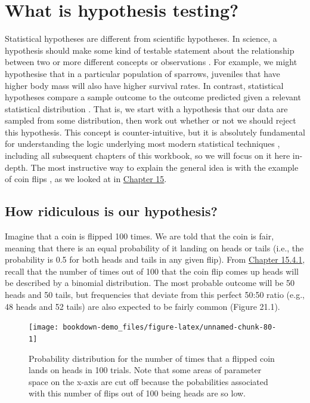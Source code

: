 \documentclass[
  openany]{scrbook}
\begin{document}
\hypertarget{Chapter_21}{%
\chapter{What is hypothesis testing?}\label{Chapter_21}}

Statistical hypotheses are different from scientific hypotheses.
In science, a hypothesis should make some kind of testable statement about the relationship between two or more different concepts or observations \citep{Bouma2000}.
For example, we might hypothesise that in a particular population of sparrows, juveniles that have higher body mass will also have higher survival rates.
In contrast, statistical hypotheses compare a sample outcome to the outcome predicted given a relevant statistical distribution \citep{Sokal1995}.
That is, we start with a hypothesis that our data are sampled from some distribution, then work out whether or not we should reject this hypothesis.
This concept is counter-intuitive, but it is absolutely fundamental for understanding the logic underlying most modern statistical techniques \citep{Sokal1995, Mayo1996, Greenland2016}, including all subsequent chapters of this workbook, so we will focus on it here in-depth.
The most instructive way to explain the general idea is with the example of coin flips \citep{Mayo1996}, as we looked at in \protect\hyperlink{Chapter_15}{Chapter 15}.

\hypertarget{how-ridiculous-is-our-hypothesis}{%
\section{How ridiculous is our hypothesis?}\label{how-ridiculous-is-our-hypothesis}}

Imagine that a coin is flipped 100 times.
We are told that the coin is fair, meaning that there is an equal probability of it landing on heads or tails (i.e., the probability is 0.5 for both heads and tails in any given flip).
From \protect\hyperlink{Chapter_15.htmlux5cux23binomial-distribution}{Chapter 15.4.1}, recall that the number of times out of 100 that the coin flip comes up heads will be described by a binomial distribution.
The most probable outcome will be 50 heads and 50 tails, but frequencies that deviate from this perfect 50:50 ratio (e.g., 48 heads and 52 tails) are also expected to be fairly common (Figure 21.1).

\begin{figure}
\texttt{[image: bookdown-demo\_files/figure-latex/unnamed-chunk-80-1]} \caption{Probability distribution for the number of times that a flipped coin lands on heads in 100 trials. Note that some areas of parameter space on the x-axis are cut off because the pobabilities associated with this number of flips out of 100 being heads are so low.}\label{fig:unnamed-chunk-80}
\end{figure}
\end{document}
